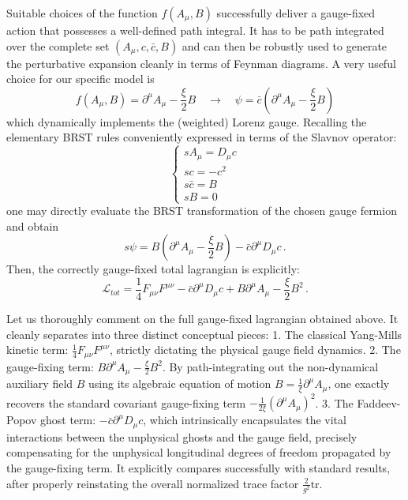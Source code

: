 Suitable choices of the function \(f(A_\mu, B)\) successfully deliver a gauge-fixed action that possesses a well-defined path integral. It has to be path integrated over the complete set \((A_\mu, c, \bar{c}, B)\) and can then be robustly used to generate the perturbative expansion cleanly in terms of Feynman diagrams. A very useful choice for our specific model is
\begin{equation} \label{eq:56}
    f(A_\mu, B) = \partial^\mu A_\mu - \frac{\xi}{2}B \quad \rightarrow \quad \psi = \bar{c}\left( \partial^\mu A_\mu - \frac{\xi}{2}B \right)
\end{equation}
which dynamically implements the (weighted) Lorenz gauge. Recalling the elementary BRST rules conveniently expressed in terms of the Slavnov operator:
\begin{equation} \label{eq:57}
    \begin{cases}
        sA_\mu = D_\mu c \\
        sc = -c^2        \\
        s\bar{c} = B     \\
        sB = 0
    \end{cases}
\end{equation}
one may directly evaluate the BRST transformation of the chosen gauge fermion and obtain
\begin{equation} \label{eq:58}
    s\psi = B\left( \partial^\mu A_\mu - \frac{\xi}{2}B \right) - \bar{c} \partial^\mu D_\mu c \, .
\end{equation}
Then, the correctly gauge-fixed total lagrangian is explicitly:
\begin{equation} \label{eq:59}
    \mathcal{L}_{tot} = \frac{1}{4}F_{\mu\nu}F^{\mu\nu} - \bar{c}\partial^\mu D_\mu c + B\partial^\mu A_\mu - \frac{\xi}{2}B^2 \, .
\end{equation}

Let us thoroughly comment on the full gauge-fixed lagrangian obtained above. It cleanly separates into three distinct conceptual pieces:
1. The classical Yang-Mills kinetic term: \(\frac{1}{4} F_{\mu\nu} F^{\mu\nu}\), strictly dictating the physical gauge field dynamics.
2. The gauge-fixing term: \(B \partial^\mu A_\mu - \frac{\xi}{2} B^2\). By path-integrating out the non-dynamical auxiliary field \(B\) using its algebraic equation of motion \(B = \frac{1}{\xi}\partial^\mu A_\mu\), one exactly recovers the standard covariant gauge-fixing term \(-\frac{1}{2\xi}(\partial^\mu A_\mu)^2\).
3. The Faddeev-Popov ghost term: \(- \bar{c} \partial^\mu D_\mu c\), which intrinsically encapsulates the vital interactions between the unphysical ghosts and the gauge field, precisely compensating for the unphysical longitudinal degrees of freedom propagated by the gauge-fixing term.
It explicitly compares successfully with standard results, after properly reinstating the overall normalized trace factor \(\frac{2}{g^2}\text{tr}\).

